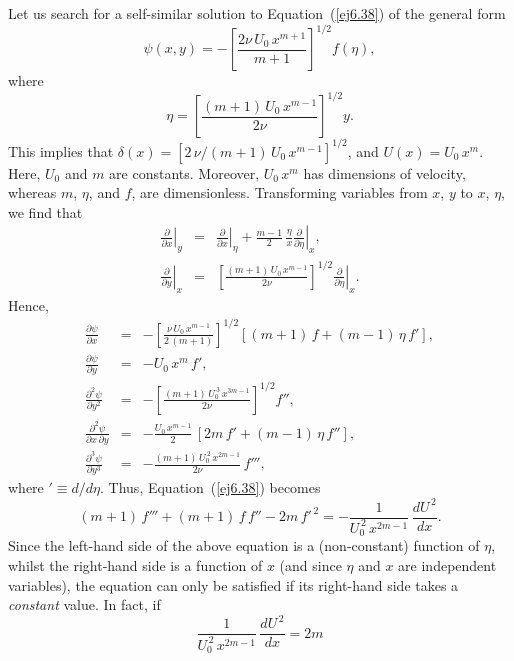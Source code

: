 Let us search for a self-similar solution to Equation~(\ref{ej6.38}) of the general form
\begin{equation}\label{ej6.45}
\psi(x,y) = -\left[\frac{2\nu\,U_0\,x^{m+1}}{m+1}\right]^{1/2}f(\eta),
\end{equation}
where
\begin{equation}\label{ej6.46}
\eta =\left[\frac{(m+1)\,U_0\,x^{m-1}}{2\nu}\right]^{1/2}y.
\end{equation}
This implies that $\delta(x)=[2\,\nu/(m+1)\,U_0\,x^{m-1}]^{1/2}$, and $U(x)=U_0\,x^m$. 
Here, $U_0$ and $m$ are constants. Moreover, $U_0\,x^m$ has dimensions of velocity, whereas $m$, $\eta$, and $f$, are dimensionless.
Transforming variables from $x$, $y$ to $x$, $\eta$, we find that
\begin{eqnarray}
\left.\frac{\partial}{\partial x}\right|_y &=& \left.\frac{\partial}{\partial x}\right|_\eta +\frac{m-1}{2}\,\frac{\eta}{x}\left.\frac{\partial}{\partial\eta}\right|_x,\\[0.5ex]
\left.\frac{\partial}{\partial y}\right|_x &=& \left[\frac{(m+1)\,U_0\,x^{m-1}}{2\nu}\right]^{1/2}\left.\frac{\partial}{\partial\eta}\right|_x.
\end{eqnarray}
Hence,
\begin{eqnarray}
\frac{\partial\psi}{\partial x} &=& -\left[\frac{\nu\,U_0\,x^{m-1}}{2\,(m+1)}\right]^{1/2}[(m+1)\,f+(m-1)\,\eta\,f'],\\[0.5ex]
\frac{\partial\psi}{\partial y} &=& - U_0\,x^m\,f',\\[0.5ex]
\frac{\partial^2\psi}{\partial y^2}&=&-\left[\frac{(m+1)\,U_0^{\,3}\,x^{3m-1}}{2\nu}\right]^{1/2}f'',\label{ej6.51}\\[0.5ex]
\frac{\partial^2\psi}{\partial x\,\partial y}&=& -\frac{U_0\,x^{m-1}}{2}\,[2m\,f'+(m-1)\,\eta\,f''],\\[0.5ex]
\frac{\partial^3\psi}{\partial y^3}&=& -\frac{(m+1)\,U_0^{\,2}\,x^{2m-1}}{2\nu}\,f''',
\end{eqnarray}
where $'\equiv d/d\eta$. Thus, Equation~(\ref{ej6.38}) 
becomes
\begin{equation}
(m+1)\,f'''+ (m+1)\,f\,f'' -2m\,f'^{\,2} = -\frac{1}{U_0^{\,2}\,x^{2m-1}}\,\frac{dU^{\,2}}{dx}.
\end{equation}
Since the left-hand side of the above equation is a (non-constant) function of $\eta$, whilst the right-hand side
is a function of $x$ (and since $\eta$ and $x$ are independent variables), the equation can only be satisfied if its right-hand
side takes a {\em constant}\/ value. In fact, if
\begin{equation}
\frac{1}{U_0^{\,2}\,x^{2m-1}}\,\frac{dU^{\,2}}{dx}=2m
\end{equation}
